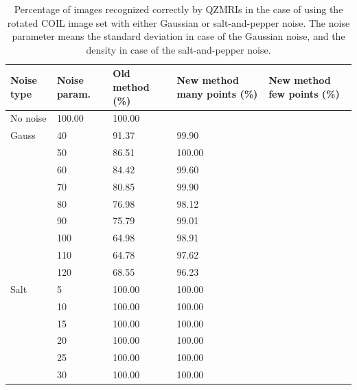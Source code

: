 \begin{table}
    \centering
    \begin{tabular}{|p{2.15cm}|p{1.8cm}|p{3cm}|p{2.74cm}|p{2.6cm}|} \hline
        \textbf{Noise type} & \textbf{Noise param.} & \textbf{Old method} (\%) & \textbf{New method} many points (\%)& \textbf{New method} few points (\%) \\ \hline\hline
        No noise & 100.00 & 100.00 &  & \\ \cline{1-5}
        Gauss & 40 & 91.37 & 99.90 &  \\ \cline{2-5}
        & 50 & 86.51 & 100.00 &  \\ \cline{2-5}
        & 60 & 84.42 & 99.60 &  \\ \cline{2-5}
        & 70 & 80.85 & 99.90 &  \\ \cline{2-5}
        & 80 & 76.98 & 98.12 &  \\ \cline{2-5}
        & 90 & 75.79 & 99.01 &  \\ \cline{2-5}
        & 100 & 64.98 & 98.91 &  \\ \cline{2-5}
        & 110 & 64.78 & 97.62 &  \\ \cline{2-5}
        & 120 & 68.55 & 96.23 &  \\ \cline{1-5}
        Salt & 5 & 100.00 & 100.00 & \\ \cline{2-5}
        & 10 & 100.00 & 100.00 &  \\ \cline{2-5}
        & 15 & 100.00 & 100.00 &  \\ \cline{2-5}
        & 20 & 100.00 & 100.00 &  \\ \cline{2-5}
        & 25 & 100.00 & 100.00 &  \\ \cline{2-5}
        & 30 & 100.00 & 100.00 &  \\ \cline{1-5}
    \end{tabular}
    \caption{Percentage of images recognized correctly by QZMRIs in the case of using the rotated COIL image set with either Gaussian or salt-and-pepper noise. The noise parameter means the standard deviation in case of the Gaussian noise, and the density in case of the salt-and-pepper noise.}
    \label{tab:recognition_rot}
\end{table}

